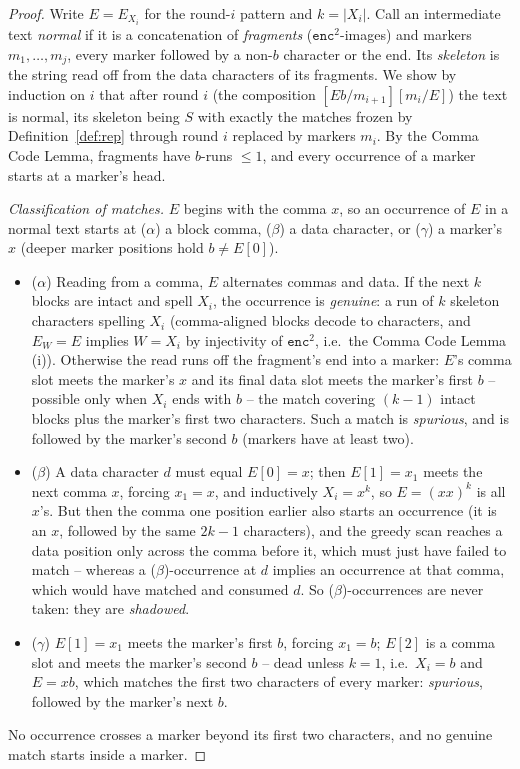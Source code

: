 \documentclass[runningheads,envcountsect]{llncs}
\begin{document}
\begin{proof}
    Write $E = E_{X_i}$ for the round-$i$ pattern and $k = |X_i|$. Call an intermediate text \emph{normal} if it is a concatenation of \emph{fragments} ($\mathtt{enc}^2$-images) and markers $m_1, \dots, m_j$, every marker followed by a non-$b$ character or the end. Its \emph{skeleton} is the string read off from the data characters of its fragments. We show by induction on $i$ that after round $i$ (the composition $[E b/m_{i+1}][m_i/E]$) the text is normal, its skeleton being $S$ with exactly the matches frozen by Definition~\ref{def:rep} through round $i$ replaced by markers $m_i$. By the Comma Code Lemma, fragments have $b$-runs $\leq 1$, and every occurrence of a marker starts at a marker's head.

    \emph{Classification of matches.} $E$ begins with the comma $x$, so an occurrence of $E$ in a normal text starts at ($\alpha$) a block comma, ($\beta$) a data character, or ($\gamma$) a marker's $x$ (deeper marker positions hold $b \neq E[0]$).
    \begin{itemize}
        \item ($\alpha$) Reading from a comma, $E$ alternates commas and data. If the next $k$ blocks are intact and spell $X_i$, the occurrence is \emph{genuine}: a run of $k$ skeleton characters spelling $X_i$ (comma-aligned blocks decode to characters, and $E_W = E$ implies $W = X_i$ by injectivity of $\mathtt{enc}^2$, i.e.\ the Comma Code Lemma (i)). Otherwise the read runs off the fragment's end into a marker: $E$'s comma slot meets the marker's $x$ and its final data slot meets the marker's first $b$ -- possible only when $X_i$ ends with $b$ -- the match covering $(k-1)$ intact blocks plus the marker's first two characters. Such a match is \emph{spurious}, and is followed by the marker's second $b$ (markers have at least two).
        \item ($\beta$) A data character $d$ must equal $E[0] = x$; then $E[1] = x_1$ meets the next comma $x$, forcing $x_1 = x$, and inductively $X_i = x^k$, so $E = (xx)^k$ is all $x$'s. But then the comma one position earlier also starts an occurrence (it is an $x$, followed by the same $2k-1$ characters), and the greedy scan reaches a data position only across the comma before it, which must just have failed to match -- whereas a ($\beta$)-occurrence at $d$ implies an occurrence at that comma, which would have matched and consumed $d$. So ($\beta$)-occurrences are never taken: they are \emph{shadowed}.
        \item ($\gamma$) $E[1] = x_1$ meets the marker's first $b$, forcing $x_1 = b$; $E[2]$ is a comma slot and meets the marker's second $b$ -- dead unless $k = 1$, i.e.\ $X_i = b$ and $E = xb$, which matches the first two characters of every marker: \emph{spurious}, followed by the marker's next $b$.
    \end{itemize}
    No occurrence crosses a marker beyond its first two characters, and no genuine match starts inside a marker.


\end{proof}
\end{document}
